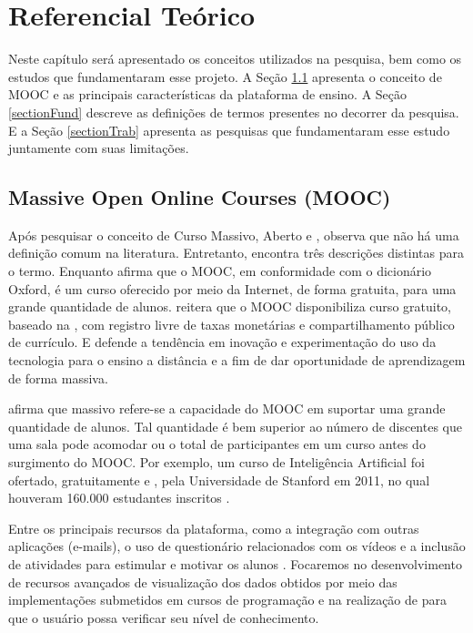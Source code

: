 \chapter{Referencial Teórico}
\label{chapterRef}
	Neste capítulo será apresentado os conceitos utilizados na pesquisa, bem como
	os estudos que fundamentaram esse projeto. A Seção \ref{sectionMooc} apresenta
	o conceito de MOOC e as principais características da plataforma de ensino. A
	Seção \ref{sectionFund} descreve as definições de termos presentes no decorrer
	da pesquisa. E a Seção \ref{sectionTrab} apresenta as pesquisas que fundamentaram
	esse estudo juntamente com suas limitações.

	\section{Massive Open Online Courses (MOOC)}
	\label{sectionMooc}
		Após pesquisar o conceito de Curso Massivo, Aberto e ,
		 observa que não há uma definição comum na
		literatura. Entretanto, encontra três descrições distintas para o termo.
		Enquanto  afirma que o MOOC, em conformidade com
		o dicionário Oxford, é um curso oferecido por meio da Internet, de forma
		gratuita, para uma grande quantidade de alunos. 
		reitera que o MOOC disponibiliza curso gratuito, baseado na ,
		com registro livre de taxas monetárias e compartilhamento público de
		currículo. E  defende a tendência em inovação e
		experimentação do uso da tecnologia para o ensino a distância e
		 a fim de dar oportunidade de aprendizagem de forma massiva.
		
		 afirma que massivo refere-se a capacidade do MOOC em
		suportar uma grande quantidade de alunos. Tal quantidade é bem superior
		ao número de discentes que uma sala pode acomodar ou o total de
		participantes em um curso  antes do surgimento do MOOC.
		Por exemplo, um curso de Inteligência Artificial foi ofertado, gratuitamente e
		, pela Universidade de Stanford em 2011, no qual houveram
		160.000 estudantes inscritos \cite{rodriguez2012}.
		
		Entre os principais recursos da plataforma, como a integração com outras
		aplicações (e-mails), o uso de questionário relacionados com os vídeos e a
		inclusão de atividades para estimular e motivar os alunos \cite{fassbinder2014}.
		Focaremos no desenvolvimento de recursos avançados de visualização dos dados
		obtidos por meio das implementações submetidos em cursos de programação e
		na realização de  para que o usuário possa verificar seu nível
		de conhecimento.

